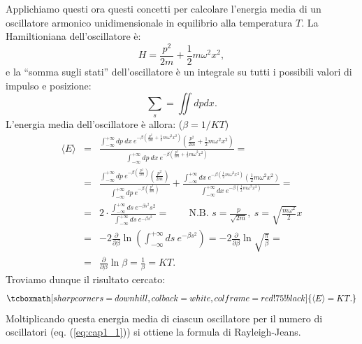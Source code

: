 Applichiamo questi ora questi concetti per calcolare l'energia media di un oscillatore armonico unidimensionale in equilibrio alla temperatura $T$. La Hamiltioniana dell'oscillatore è:
	\begin{equation}
		H= \frac{p^2}{2m}+\frac{1}{2}m \omega ^2 x^2 , 
	\end{equation}
e la ``somma sugli stati'' dell'oscillatore è un integrale su tutti i possibili valori di impulso e posizione:
	\begin{equation}
		\sum _s = \iint dp dx .
	\end{equation}
L'energia media dell'oscillatore è allora: ($\beta = 1/KT$)
	\begin{eqnarray}
		\langle E \rangle &=& \frac{\int _{-\infty} ^{+\infty} dp\ dx \ e^{-\beta \left( \frac{p^2}{2m}+\frac{1}{2}m \omega ^2x^2\right)}\left( \frac{p^2}{2m}+\frac{1}{2}m \omega ^2x^2\right)}{\int _{-\infty} ^{+\infty} dp\ dx\ e^{-\beta \left( \frac{p^2}{2m}+\frac{1}{2}m \omega ^2x^2\right)}}= \nonumber \\
		&=&\frac{\int _{-\infty} ^{+\infty} dp \ e^{-\beta \left( \frac{p^2}{2m}\right)}\left( \frac{p^2}{2m}\right)}{\int _{-\infty} ^{+\infty} dp \  e^{-\beta \left( \frac{p^2}{2m}\right)}} + \frac{\int _{-\infty} ^{+\infty}  dx \  e^{-\beta \left(\frac{1}{2}m \omega ^2x^2\right)}\left(\frac{1}{2}m \omega ^2x^2\right)}{\int _{-\infty} ^{+\infty} dx\ e^{-\beta \left( \frac{1}{2}m \omega ^2x^2\right)}}= \nonumber \\
		&=& 2\cdot \frac{\int _{-\infty} ^{+\infty}ds \  e^{-\beta s^2}s^2}{\int _{-\infty} ^{+\infty}ds \  e^{-\beta s^2}}= \qquad \scriptstyle{\textrm{N.B. } s=\frac{p}{\sqrt{2m}}, \ s= \sqrt{\frac{m \omega ^2}{2}}x}\nonumber \\
		&=&-2 \frac{\partial}{\partial \beta} \ln \left(\int _{-\infty} ^{+\infty}ds \  e^{-\beta s^2} \right) = -2\frac{\partial}{\partial \beta} \ln \sqrt{\frac{\pi}{\beta}}= \nonumber \\
	&=& \frac{\partial}{\partial \beta} \ln \beta = \frac{1}{\beta}= KT. 
	\end{eqnarray}
Troviamo dunque il risultato cercato:
	\begin{equation}
	\tcboxmath[sharp corners=downhill ,colback=white,colframe=red!75!black]{
			\langle E \rangle = KT.
	}
	\label{eq:cap1_2}
\end{equation}
Moltiplicando questa energia media di ciascun oscillatore per il numero di oscillatori (eq. (\ref{eq:cap1_1})) si ottiene la formula di Rayleigh-Jeans.\\

